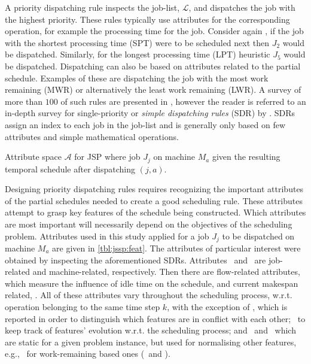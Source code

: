 \documentclass[smallextended]{svjour3}
\begin{document}
A priority dispatching rule inspects the job-list, $\mathcal{L}$, and 
dispatches the job with the highest priority. 
These rules typically use attributes for the corresponding operation, for 
example the processing time for the job. 
Consider again , if the job with the shortest processing 
time (SPT) were to be scheduled next then $J_2$ would be dispatched. Similarly, 
for the longest processing time (LPT) heuristic $J_5$ would be dispatched. 
Dispatching can also be based on attributes related to the partial schedule. 
Examples of these are dispatching the job with the most work remaining (MWR) or 
alternatively the least work remaining (LWR). A survey of more than $100$ of 
such rules are presented in \citet{Panwalkar77}, however the reader is referred 
to an in-depth survey for single-priority or \emph{simple dispatching rules} 
(SDR) by \citet{Haupt89}.  SDRs assign an index to each job in the job-list and 
is generally only based on few attributes and simple mathematical operations.

\begin{table}[t!] \centering
	\caption[Attribute space $\mathcal{A}$ for JPS]{Attribute space $\mathcal{A}$ 
		for JSP where job $J_j$ on machine $M_a$ given the resulting temporal 
		schedule after dispatching $(j,a)$.
	}
	\label{tbl:jssp:feat}
	
\end{table}

Designing priority dispatching rules requires recognizing the important 
attributes of the partial schedules needed to create a good scheduling rule. 
These attributes attempt to grasp key features of the schedule being 
constructed. Which attributes are most important will necessarily depend on the
objectives of the scheduling problem. Attributes used in this study applied for 
a job $J_j$ to be dispatched on machine $M_a$ are given in \cref{tbl:jssp:feat}.
The attributes of particular interest were obtained by inspecting the 
aforementioned SDRs. Attributes \phiJobRelated\ and \phiMacRelated\ are 
job-related and machine-related, respectively. 
Then there are flow-related attributes, \phiFlowRelated\, which measure the 
influence of idle time on the schedule, and current makespan related, 
\phiScheduleRelated.
All of these attributes vary throughout the scheduling process, w.r.t. 
operation belonging to the same time step $k$, with the exception of \phimac, 
which is reported in order to distinguish which features are in conflict with 
each other;
\phistep\ to keep track of features' evolution w.r.t. the scheduling process; 
and \phitotalProc\ and \phiwrmTotal\ which are static for a given problem 
instance, but used for normalising other features, e.g., \phiwrmTotal\ for 
work-remaining based ones (\phiwrmJob\ and \phiwrmMac).
\end{document}
